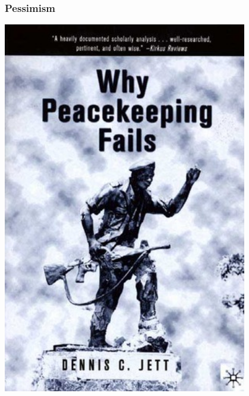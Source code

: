\documentclass[aspectratio=43]{beamer}
\begin{document}
\begin{frame}
\frametitle{Pessimism}
\centering

\begin{minipage}{0.49\textwidth}\centering
\includegraphics[width = 0.8\textwidth]{img/why-pk-fails}\\
\end{minipage}\hfill
\begin{minipage}{0.49\textwidth}\centering

\end{minipage}
\end{frame}
\end{document}
